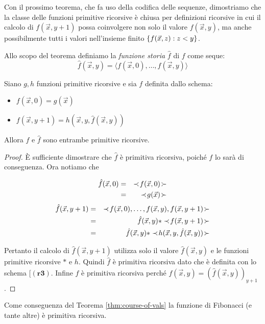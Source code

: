 \documentclass[runningheads,a4paper]{llncs}
\begin{document}
Con il prossimo teorema, che fa uso della codifica delle sequenze, dimostriamo che la classe delle funzioni primitive ricorsive \`{e} chiusa per definizioni ricorsive in cui il calcolo di  $f(\vec x,y+1)$ possa coinvolgere non solo il valore $f(\vec x,y)$, ma anche possibilmente tutti i valori nell'insieme finito $\{f(\vec x,z) : z < y \}$.

Allo scopo del teorema definiamo la \emph{funzione storia} $\hat{f}$ di $f$ come seque:
$$ \hat{f}(\vec x,y) = \langle f(\vec x,0),\ldots,f(\vec x,y)\rangle $$

\begin{theorem}\label{thm:course-of-vals}
Siano $g,h$ funzioni primitive ricorsive e sia $f$ definita dallo schema:
\begin{itemize}
  \item[ ] $f(\vec x,0) = g(\vec x)$ 
  \item[ ] $f(\vec x,y+1) = h(\vec x,y,\hat{f}(\vec x,y))$
\end{itemize}
Allora $f$ e $\hat{f}$ sono entrambe primitive ricorsive.
\end{theorem}

\begin{proof}
\`{E} sufficiente dimostrare che $\hat{f}$ \`{e} primitiva ricorsiva, poich\'{e} $f$ lo sar\`{a} di conseguenza. Ora notiamo che 

\begin{eqnarray*}
\hat{f}(\vec x,0) & = & \prec\! f(\vec x,0) \!\succ \\
 & = & \prec\! g(\vec x) \!\succ
\end{eqnarray*}
\begin{eqnarray*}
\hat{f}(\vec x,y+1) & = & \prec\! f(\vec x,0),\ldots,f(\vec x,y),f(\vec x,y+1) \!\succ \\
 & = & \hat{f}(\vec x,y) \ast \prec\! f(\vec x,y+1) \!\succ \\
 & = & \hat{f}(\vec x,y) \ast \prec\! h(\vec x,y,\hat{f}(\vec x,y)) \!\succ
\end{eqnarray*}

Pertanto il calcolo di $\hat{f}(\vec x,y+1)$ utilizza solo il valore $\hat{f}(\vec x,y)$ e le funzioni primitive ricorsive $\ast$ e $h$. Quindi $\hat{f}$ \`{e} primitiva ricorsiva dato che \`{e} definita con lo schema [$(\mathbf{r3})$. Infine $f$ \`{e} primitiva ricorsiva perch\'{e} $f(\vec x,y) = (\hat{f}(\vec x,y))_{y+1}$.
\end{proof}

Come conseguenza del Teorema \ref{thm:course-of-vals} la funzione di Fibonacci (e tante altre) \`{e} primitiva ricorsiva.
\end{document}
